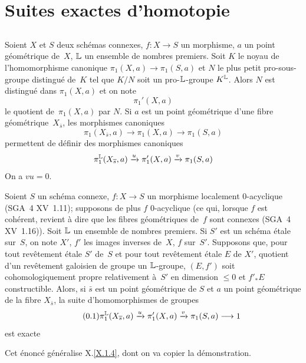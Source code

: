 \section{Suites exactes d'homotopie}\label{XIII.4}\setcounter{subsection}{-1}
\subsection{}
\label{XIII.4.0}
Soient $X$ et $S$ deux sch\'emas connexes, $f\colon X\to S$ un
morphisme, $a$ un point g\'eom\'etrique de~$X$, $\mathbb{L}$ un ensemble
de nombres premiers. Soit $K$ le noyau de l'homomorphisme canonique
$\pi_1(X,a)\to\pi_1(S,a)$ et $N$ le plus petit pro-sous-groupe
distingu\'e de~$K$ tel que $K/N$ soit un pro-$\mathbb{L}$-groupe
$K^{\mathbb{L}}$. Alors $N$ est distingu\'e dans $\pi_1(X,a)$ et on note
$$
\pi_1'(X,a)
$$
\label{indnot:mj}le
quotient de~$\pi_1(X,a)$ par $N$. Si $a$ est un point
g\'eom\'etrique d'une fibre g\'eom\'etrique~$X_{\bar{s}}$, les
morphismes canoniques
$$
\pi_1(X_{\bar{s}},a)\to \pi_1(X,a) \to
\pi_1(S,a)
$$
permettent de d\'efinir des morphismes canoniques
$$
\pi_1^{\mathbb{L}}(X_{\overline{s}},a)\xrightarrow{u} \pi_1'(X,a) \xrightarrow{v} \pi_1(S,a)
$$
On a $vu=0$.

\begin{proposition}
\label{XIII.4.1}
Soient $S$ un sch\'ema connexe, $f\colon X\to S$ un morphisme
localement $0$-acyclique \textup{(SGA~4 XV~1.11)}; supposons de plus $f$
$0$-acyclique (ce qui, lorsque $f$ est coh\'erent, revient \`a
dire que les fibres g\'eom\'etriques de~$f$ sont connexes \textup{(SGA~4
XV~1.16)}). Soit $\mathbb{L}$ un ensemble de nombres premiers. Si $S'$ est un
sch\'ema \'etale sur~$S$, on note $X'$, $f'$ les images inverses
de~$X$, $f$ sur~$S'$. Supposons que, pour tout rev\^etement
\'etale $S'$ de~$S$ et pour tout rev\^etement \'etale $E$ de
$X'$, quotient d'un rev\^etement galoisien de groupe un
$\mathbb{L}$-groupe, $(E,f')$ soit cohomologiquement propre relativement
\`a~$S'$ en dimension $\leqslant 0$ et $f'_* E$
constructible. Alors, si $\bar{s}$ est un point g\'eom\'etrique de
$S$ et $a$ un point g\'eom\'etrique de la fibre $X_{\bar{s}}$, la
suite d'homomorphismes de groupes
\begin{equation*}
\label{eq:XIII.4.1.1}
\tag{\thesubsection.1}
\pi_1^{\LL}(X_{\bar{s}},a)\lto{u} \pi_1'(X,a)\lto{v}\pi_1(S,a)\to1
\end{equation*}
est exacte
\end{proposition}

Cet \'enonc\'e g\'en\'eralise X.\ref{X.1.4}, dont on va copier
la d\'emonstration.

